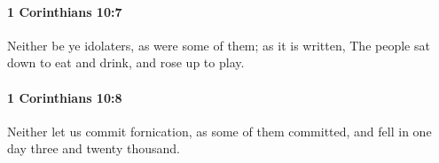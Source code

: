 		\paragraph{1 Corinthians 10:7} %
			\label{1CORINTHIANS-10-7}

			Neither be ye idolaters, as were some of them; as it is written, The people sat down to eat and drink, and rose up to play.

			\begin{framed}
				\scriptsize
				\begin{compactdesc}
					\item[SBLG] 
				\end{compactdesc}
			\end{framed}

		\paragraph{1 Corinthians 10:8} %
			\label{1CORINTHIANS-10-8}

			Neither let us commit fornication, as some of them committed, and fell in one day three and twenty thousand.

